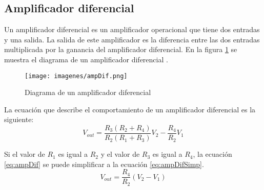 \subsection{Amplificador diferencial}
\label{sec:ampDif}
Un amplificador diferencial es un amplificador operacional que tiene dos entradas
y una salida. La salida de este amplificador es la diferencia entre las dos entradas
multiplicada por la ganancia del amplificador diferencial. En la figura \ref{fig:ampDif}
se muestra el diagrama de un amplificador diferencial \cite{electronic_Boylestad}.

\begin{figure}[H]
    \centering
    \texttt{[image: imagenes/ampDif.png]}
    \caption{Diagrama de un amplificador diferencial \cite{electronic_Boylestad}}
    \label{fig:ampDif}
\end{figure}

La ecuación que describe el comportamiento de un amplificador diferencial es la siguiente:
\begin{equation}
    V_{out} =  \frac{R_3(R_2+R_4)}{R_2(R_1+R_3)}V_2 - \frac{R_4}{R_2}V_1
    \label{eq:ampDif}
\end{equation}

Si el valor de $R_1$ es igual a $R_2$ y el valor de $R_3$ es igual a $R_4$, la ecuación
\ref{eq:ampDif} se puede simplificar a la ecuación \ref{eq:ampDifSimp}.
\begin{equation}
    V_{out} =  \frac{R_4}{R_2}(V_2 - V_1)
    \label{eq:ampDifSimp}
\end{equation}